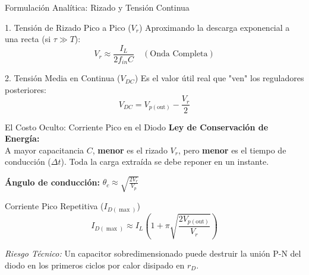 \documentclass[10pt, aspectratio=169]{beamer}
\begin{document}
\begin{frame}{Formulación Analítica: Rizado y Tensión Continua}
  \begin{block}{1. Tensión de Rizado Pico a Pico ($V_r$)}
      Aproximando la descarga exponencial a una recta (si $\tau \gg T$):
      \begin{equation*}
          V_r \approx \frac{I_L}{2 f_{in} C} \quad (\text{Onda Completa})
      \end{equation*}
  \end{block}
  
  \vspace{0.3cm}
  \begin{block}{2. Tensión Media en Continua ($V_{DC}$)}
      Es el valor útil real que "ven" los reguladores posteriores:
      \begin{equation*}
          V_{DC} = V_{p(\text{out})} - \frac{V_r}{2}
      \end{equation*}
  \end{block}
\end{frame}

\begin{frame}{El Costo Oculto: Corriente Pico en el Diodo}
  \alert{\textbf{Ley de Conservación de Energía:}}\\
  A mayor capacitancia $C$, \textbf{menor} es el rizado $V_r$, pero \textbf{menor} es el tiempo de conducción ($\Delta t$). Toda la carga extraída se debe reponer en un instante.
  
  \vspace{0.2cm}
  \textbf{Ángulo de conducción:} $\theta_c \approx \sqrt{\frac{2 V_r}{V_p}}$
  
  \vspace{0.2cm}
  \begin{block}{Corriente Pico Repetitiva ($I_{D(\max)}$)}
      \begin{equation*}
          I_{D(\max)} \approx I_L \left( 1 + \pi \sqrt{\frac{2 V_{p(\text{out})}}{V_r}} \right)
      \end{equation*}
  \end{block}
  \textit{Riesgo Técnico:} Un capacitor sobredimensionado puede destruir la unión P-N del diodo en los primeros ciclos por calor disipado en $r_D$.
\end{frame}
\end{document}
